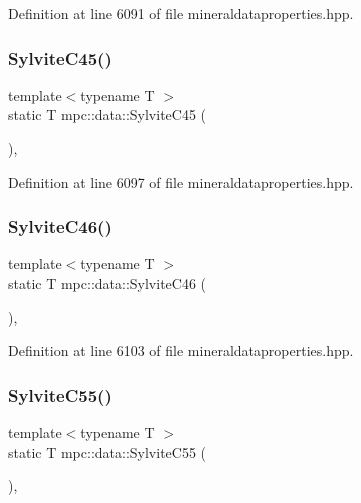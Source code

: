 Definition at line 6091 of file mineraldataproperties.\+hpp.

\mbox{\label{namespacempc_1_1data_a3784add159932b48e09f6b615c1406b4}} 
\subsubsection{\texorpdfstring{Sylvite\+C45()}{SylviteC45()}}
{\footnotesize\ttfamily template$<$typename T $>$ \\
static T mpc\+::data\+::\+Sylvite\+C45 (\begin{DoxyParamCaption}{ }\end{DoxyParamCaption})\hspace{0.3cm}{\ttfamily [inline]}, {\ttfamily [static]}}



Definition at line 6097 of file mineraldataproperties.\+hpp.

\mbox{\label{namespacempc_1_1data_a1b1ef8d34daa83be5186110cb9b8b6d4}} 
\subsubsection{\texorpdfstring{Sylvite\+C46()}{SylviteC46()}}
{\footnotesize\ttfamily template$<$typename T $>$ \\
static T mpc\+::data\+::\+Sylvite\+C46 (\begin{DoxyParamCaption}{ }\end{DoxyParamCaption})\hspace{0.3cm}{\ttfamily [inline]}, {\ttfamily [static]}}



Definition at line 6103 of file mineraldataproperties.\+hpp.

\mbox{\label{namespacempc_1_1data_a0e06a90eedd391b55178eb11c16a5016}} 
\subsubsection{\texorpdfstring{Sylvite\+C55()}{SylviteC55()}}
{\footnotesize\ttfamily template$<$typename T $>$ \\
static T mpc\+::data\+::\+Sylvite\+C55 (\begin{DoxyParamCaption}{ }\end{DoxyParamCaption})\hspace{0.3cm}{\ttfamily [inline]}, {\ttfamily [static]}}



